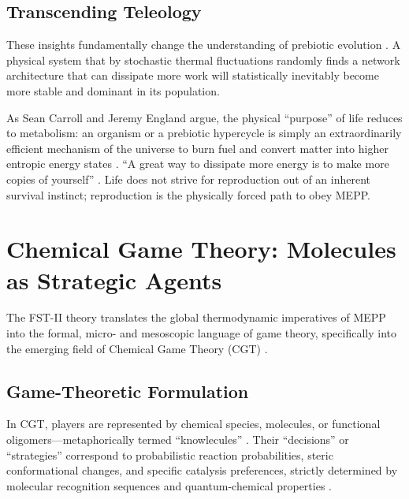\documentclass[12pt,a4paper]{article}
\theoremstyle{remark}
\begin{document}
\subsection{Transcending Teleology}

These insights fundamentally change the understanding of prebiotic evolution \citep{UnbecomingBeing}. A physical system that by stochastic thermal fluctuations randomly finds a network architecture that can dissipate more work will statistically inevitably become more stable and dominant in its population.

As Sean Carroll and Jeremy England argue, the physical ``purpose'' of life reduces to metabolism: an organism or a prebiotic hypercycle is simply an extraordinarily efficient mechanism of the universe to burn fuel and convert matter into higher entropic energy states \citep{UnbecomingBeing}. ``A great way to dissipate more energy is to make more copies of yourself'' \citep{OvershootLoop}. Life does not strive for reproduction out of an inherent survival instinct; reproduction is the physically forced path to obey MEPP.

\section{Chemical Game Theory: Molecules as Strategic Agents}
\label{sec:cgt}

The FST-II theory translates the global thermodynamic imperatives of MEPP into the formal, micro- and mesoscopic language of game theory, specifically into the emerging field of Chemical Game Theory (CGT) \citep{CGT2018,CGTMacmillan}.

\subsection{Game-Theoretic Formulation}

In CGT, players are represented by chemical species, molecules, or functional oligomers---metaphorically termed ``knowlecules'' \citep{CGT2018}. Their ``decisions'' or ``strategies'' correspond to probabilistic reaction probabilities, steric conformational changes, and specific catalysis preferences, strictly determined by molecular recognition sequences and quantum-chemical properties \citep{ThermodynamicSelection}.
\end{document}

